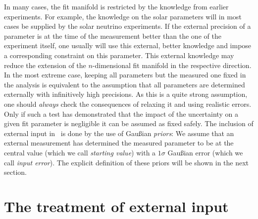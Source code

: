 In many cases, the fit manifold is restricted by the knowledge 
from earlier experiments. For example, the knowledge on the solar 
parameters will in most cases be supplied by the solar neutrino experiments. 
If the external precision of a parameter is at the time of the 
measurement better than the one of the experiment itself, one usually will use
this external, better knowledge and impose a corresponding constraint
 on this parameter. This external knowledge may reduce the extension of the 
$n$-dimensional fit manifold in the respective direction. In the most 
extreme case, keeping all parameters but the measured one fixed 
in the analysis is equivalent to the assumption that all parameters 
are determined externally with infinitively high precisions. As this 
is a quite strong assumption, one should \emph{always} check the 
consequences of relaxing it and using realistic errors. Only if such
a test has demonstrated that the impact of the uncertainty on a 
given fit parameter is negligible it can be assumed as fixed safely. 
 The inclusion of external input in \GLOBES\ is done by the use of 
Gau\ss ian {\em priors}: We assume that an external measurement has 
determined the measured parameter to be at the central value 
(which we call {\em starting value}) with a $1 \sigma$ Gau\ss ian error 
(which we call {\em input error}). The explicit definition of these 
priors will be shown in the next section. 

\section{The treatment of external input}
\label{sec:externalinput}

